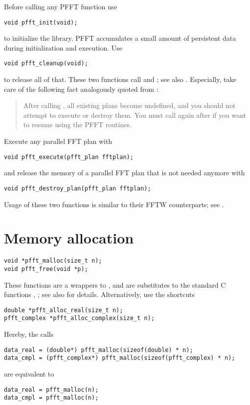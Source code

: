 Before calling any PFFT function use
\begin{lstlisting}
void pfft_init(void);
\end{lstlisting}
to initialize the library. PFFT accumulates a small amount of persistent data during initialization and execution. Use
\begin{lstlisting}
void pfft_cleanup(void);
\end{lstlisting}
to release all of that. These two functions call  and ; see also \cite{fftw-mpi-init}.
Especially, take care of the following fact analogously quoted from \cite{fftw-mpi-init}:
\begin{quote}
  After calling , all existing plans become undefined, and you should not attempt
  to execute or destroy them. You must call  again after  if you want to resume using the PFFT routines.
\end{quote}
Execute any parallel FFT plan  with
\begin{lstlisting}
void pfft_execute(pfft_plan fftplan);
\end{lstlisting}
and release the memory of a parallel FFT plan that is not needed anymore with
\begin{lstlisting}
void pfft_destroy_plan(pfft_plan fftplan);
\end{lstlisting}
Usage of these two functions is similar to their FFTW counterparts; see \cite{fftw-plans}.


\section{Memory allocation}
\begin{lstlisting}
void *pfft_malloc(size_t n);
void pfft_free(void *p);
\end{lstlisting}
These functions are a wrappers to ,  and are substitutes to the standard C functions , ; see also \cite{fftw-malloc} for details.
Alternatively, use the shortcuts
\begin{lstlisting}
double *pfft_alloc_real(size_t n);
pfft_complex *pfft_alloc_complex(size_t n);
\end{lstlisting}
Hereby, the calls
\begin{lstlisting}
data_real = (double*) pfft_malloc(sizeof(double) * n);
data_cmpl = (pfft_complex*) pfft_malloc(sizeof(pfft_complex) * n);
\end{lstlisting}
are equivalent to
\begin{lstlisting}
data_real = pfft_malloc(n);
data_cmpl = pfft_malloc(n);
\end{lstlisting}

